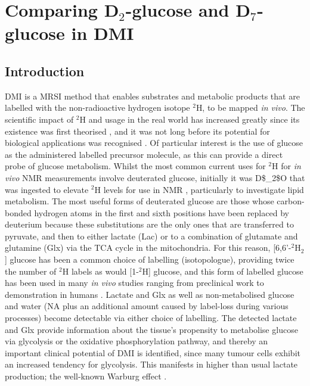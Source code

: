 \chapter{Comparing D$_2$-glucose and D$_7$-glucose in DMI}
\label{Chap:Glucose}

\section{Introduction}

\ac{DMI} is a \ac{MRSI} method that enables substrates and metabolic products that are labelled with the non-radioactive hydrogen isotope $^2$H, to be mapped \textit{in vivo}. The scientific impact of $^2$H and usage in the real world has increased greatly since its existence was first theorised \cite{Urey1932AConcentration}, and it was not long before its potential for biological applications was recognised \cite{Schoenheimer1935DeuteriumMetabolism, Schoenheimer1938TheMetabolism}. Of particular interest is the use of glucose as the administered labelled precursor molecule, as this can provide a direct probe of glucose metabolism. Whilst the most common current uses for $^2$H for \textit{in vivo} \ac{NMR} measurements involve deuterated glucose, initially it was \ac{D$_2$O} that was ingested to elevate $^2$H levels for use in \ac{NMR} \cite{Brereton1986PreliminarySpectroscopy, Irving1987InSpectroscopy}, particularly to investigate lipid metabolism. The most useful forms of deuterated glucose are those whose carbon-bonded hydrogen atoms in the first and sixth positions have been replaced by deuterium because these substitutions are the only ones that are transferred to pyruvate, and then to either lactate (Lac) or to a combination of glutamate and glutamine (Glx) via the \ac{TCA} cycle in the mitochondria. For this reason, [6,6'-$^2$H$_2$] glucose has been a common choice of labelling (isotopologue), providing twice the number of $^2$H labels as would [1-$^2$H] glucose, and this form of labelled glucose has been used in many \textit{in vivo} studies ranging from preclinical work \cite{Lu2017QuantitativeSpectroscopy, Meerwaldt2023InImaging} to demonstration in humans  \cite{DeFeyter2018DeuteriumVivo, Roig2022Deuterium7T}. Lactate and Glx as well as non-metabolised glucose and water (\ac{NA} plus an additional amount caused by label-loss during various processes) become detectable via either choice of labelling. The detected lactate and Glx provide information about the tissue’s propensity to metabolise glucose via glycolysis or the oxidative phosphorylation pathway, and thereby an important clinical potential of DMI is identified, since many tumour cells exhibit an increased tendency for glycolysis. This manifests in higher than usual lactate production;  the well-known Warburg effect \cite{Warburg1956OnCells}.    


